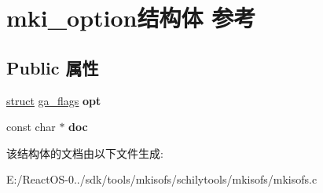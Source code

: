 \hypertarget{structmki__option}{}\section{mki\+\_\+option结构体 参考}
\label{structmki__option}
\subsection*{Public 属性}
\begin{DoxyCompactItemize}
\item 
\mbox{\label{structmki__option_ac03b06b110cd8c43286a43baa62025a8}} 
\hyperlink{interfacestruct}{struct} \hyperlink{structga__flags}{ga\+\_\+flags} {\bfseries opt}
\item 
\mbox{\label{structmki__option_a7821617680e9a237cbce2731e7aed9b1}} 
const char $\ast$ {\bfseries doc}
\end{DoxyCompactItemize}


该结构体的文档由以下文件生成\+:\begin{DoxyCompactItemize}
\item 
E\+:/\+React\+O\+S-\/0../sdk/tools/mkisofs/schilytools/mkisofs/mkisofs.\+c\end{DoxyCompactItemize}
